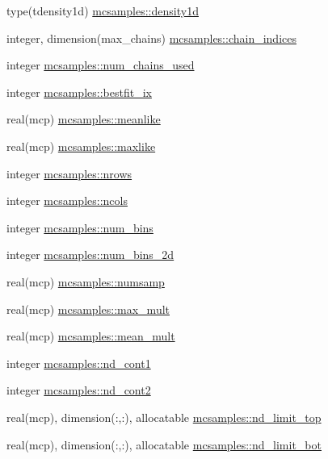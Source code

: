 \begin{DoxyCompactItemize}
type(tdensity1d) \mbox{\hyperlink{namespacemcsamples_aa7682e36ef34bef4b8112f058f435415}{mcsamples\+::density1d}}
\item 
integer, dimension(max\+\_\+chains) \mbox{\hyperlink{namespacemcsamples_a196c1e189b163a496c0da2fcc96bf1f4}{mcsamples\+::chain\+\_\+indices}}
\item 
integer \mbox{\hyperlink{namespacemcsamples_a19f7c9315f7bf1a0fdcc248d0e9b9757}{mcsamples\+::num\+\_\+chains\+\_\+used}}
\item 
integer \mbox{\hyperlink{namespacemcsamples_ab3c722f8f5dd4ef38228bf41b333bf36}{mcsamples\+::bestfit\+\_\+ix}}
\item 
real(mcp) \mbox{\hyperlink{namespacemcsamples_ad9b26e8c7b01068cd5e285b2710ffff9}{mcsamples\+::meanlike}}
\item 
real(mcp) \mbox{\hyperlink{namespacemcsamples_a084bb79be779410b498f439e52a95c5e}{mcsamples\+::maxlike}}
\item 
integer \mbox{\hyperlink{namespacemcsamples_a3bf0377c41ca6723a2a682fdec7c7cba}{mcsamples\+::nrows}}
\item 
integer \mbox{\hyperlink{namespacemcsamples_a9c7a895a8bbc32cc9ec5a4e647f93842}{mcsamples\+::ncols}}
\item 
integer \mbox{\hyperlink{namespacemcsamples_a5b2ac0e6e68dd652c494d1b7bd789f96}{mcsamples\+::num\+\_\+bins}}
\item 
integer \mbox{\hyperlink{namespacemcsamples_a2adeb191d79be31ecfbaafc674ada8d1}{mcsamples\+::num\+\_\+bins\+\_\+2d}}
\item 
real(mcp) \mbox{\hyperlink{namespacemcsamples_a1c72401a481311c1c4b5b4d7c0b4b1d8}{mcsamples\+::numsamp}}
\item 
real(mcp) \mbox{\hyperlink{namespacemcsamples_a65308a62158ea3cd86ad4582d51e8cfe}{mcsamples\+::max\+\_\+mult}}
\item 
real(mcp) \mbox{\hyperlink{namespacemcsamples_a1ccd58a9a808001ffe645de8327594a2}{mcsamples\+::mean\+\_\+mult}}
\item 
integer \mbox{\hyperlink{namespacemcsamples_a76ea49efc6873b3f02d34f24ce452d5b}{mcsamples\+::nd\+\_\+cont1}}
\item 
integer \mbox{\hyperlink{namespacemcsamples_a42ec49d9a1202d3d9f840a5ae8a62420}{mcsamples\+::nd\+\_\+cont2}}
\item 
real(mcp), dimension(\+:,\+:), allocatable \mbox{\hyperlink{namespacemcsamples_a381886fbfe1702b96dbe899d11a79daa}{mcsamples\+::nd\+\_\+limit\+\_\+top}}
\item 
real(mcp), dimension(\+:,\+:), allocatable \mbox{\hyperlink{namespacemcsamples_af6035de97e3096d7ba8ee9ac9a2d8e1b}{mcsamples\+::nd\+\_\+limit\+\_\+bot}}

\end{DoxyCompactItemize}
